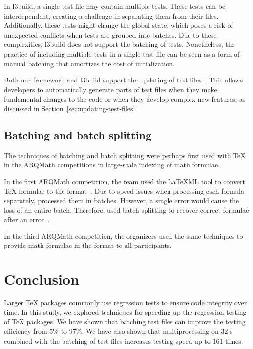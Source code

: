 \documentclass[final]{ltugboat}
\begin{document}
In l3build, a single test file may contain multiple tests. These tests can be interdependent, creating a challenge in separating them from their files. Additionally, these tests might change the global state, which poses a risk of unexpected conflicts when tests are grouped into batches. Due to these complexities, l3build does not support the batching of tests. Nonetheless, the practice of including multiple tests in a single test file can be seen as a form of manual batching that amortizes the cost of initialization.

Both our framework and l3build support the updating of test files~\cite[Section~2.7]{latex2023l3build}. This allows developers to automatically generate parts of test files when they make fundamental changes to the code or when they develop complex new features, as discussed in Section~\ref{sec:updating-test-files}.

\subsection{Batching and batch splitting}
The techniques of batching and batch splitting were perhaps first used with \TeX{} in the ARQMath competitions in large-scale indexing of math formulae.

In the first ARQMath competition, the  team used the \LaTeX ML tool to convert \TeX{} formulae to the  format~\cite[Section~2.2]{novotny2020three}. Due to speed issues when processing each formula separately,  processed them in batches. However, a single error would cause the loss of an entire batch. Therefore,  used batch splitting to recover correct formulae after an error~\cite{novotny2020arqmath}.

In the third ARQMath competition, the organizers used the same techniques to provide math formulae in the  format to all participants.

\section{Conclusion}
\label{sec:conclusion}

Larger \TeX{} packages commonly use regression tests to ensure code integrity over time.
In this study, we explored techniques for speeding up the regression testing of \TeX{} packages. We have shown that batching test files can improve the testing efficiency from 5\% to 97\%. We have also shown that multiprocessing on 32 s combined with the batching of test files increases testing speed up to 161 times.
\end{document}

